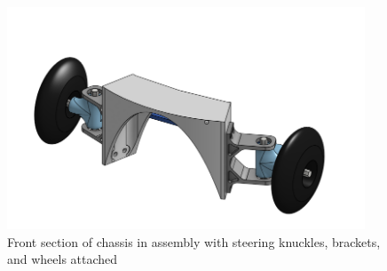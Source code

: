 \begin{figure}[ht]
\hfill%
\begin{minipage}[b]{.48\textwidth}
  \centering
  \includegraphics[width=0.95\textwidth]{Meetings/October/10-22-22/10-02-22_CAD_Figure3.PNG}
  \caption{Front section of chassis in assembly with steering knuckles, brackets, and wheels attached}
  \label{fig:pic2}
\end{minipage}
\end{figure}

